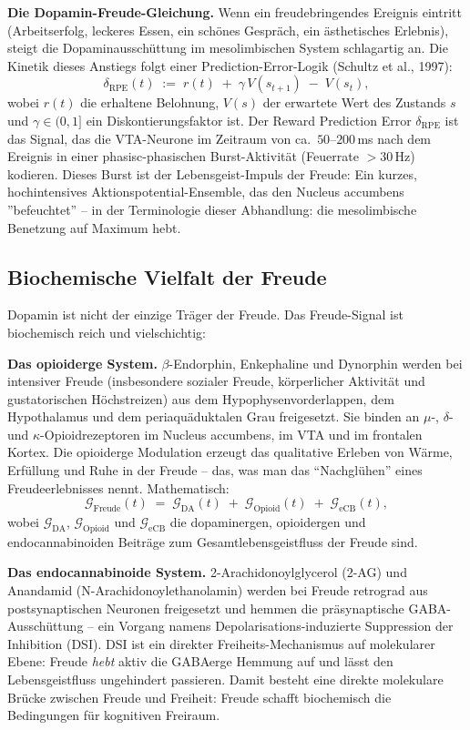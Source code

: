 ﻿\documentclass[12pt,a4paper]{report}
\theoremstyle{plain}
\theoremstyle{definition}
\theoremstyle{remark}
\begin{document}
	\textbf{Die Dopamin-Freude-Gleichung.}
	Wenn ein freudebringendes Ereignis eintritt (Arbeitserfolg,
	leckeres Essen, ein schönes Gespräch, ein ästhetisches Erlebnis),
	steigt die Dopaminausschüttung im mesolimbischen System
	schlagartig an. Die Kinetik dieses Anstiegs folgt einer
	Prediction-Error-Logik (Schultz et al., 1997):
	\[
	\delta_{\mathrm{RPE}}(t)
	\;:=\; r(t) \;+\; \gamma\,V(s_{t+1}) \;-\; V(s_t),
	\]
	wobei $r(t)$ die erhaltene Belohnung, $V(s)$ der erwartete Wert
	des Zustands $s$ und $\gamma \in (0,1]$ ein Diskontierungsfaktor ist.
	Der Reward Prediction Error $\delta_{\mathrm{RPE}}$ ist das Signal,
	das die VTA-Neurone im Zeitraum von ca.\ $50$--$200$\,ms nach
	dem Ereignis in einer phasisc-phasischen Burst-Aktivität
	(Feuerrate $> 30$\,Hz) kodieren.
	Dieses Burst ist der Lebensgeist-Impuls der Freude:
	Ein kurzes, hochintensives Aktionspotential-Ensemble, das den
	Nucleus accumbens ''befeuchtet'' -- in der Terminologie dieser
	Abhandlung: die mesolimbische Benetzung auf Maximum hebt.

	\subsection{Biochemische Vielfalt der Freude}

	Dopamin ist nicht der einzige Träger der Freude.
	Das Freude-Signal ist biochemisch reich und vielschichtig:

	\textbf{Das opioiderge System.}
	$\beta$-Endorphin, Enkephaline und Dynor\-phin werden bei intensiver
	Freude (insbesondere sozialer Freude, körperlicher Aktivität und
	gustatorischen Höchstreizen) aus dem Hypophysenvorderlappen,
	dem Hypothalamus und dem periaquäduktalen Grau freigesetzt.
	Sie binden an $\mu$-, $\delta$- und $\kappa$-Opioidrezeptoren
	im Nucleus accumbens, im VTA und im frontalen Kortex.
	Die opioiderge Modulation erzeugt das qualitative Erleben
	von Wärme, Erfüllung und Ruhe in der Freude --
	das, was man das ``Nachglühen'' eines Freudeerlebnisses nennt.
	Mathematisch:
	\[
	\mathcal{G}_{\mathrm{Freude}}(t)
	\;=\; \mathcal{G}_{\mathrm{DA}}(t)
	\;+\; \mathcal{G}_{\mathrm{Opioid}}(t)
	\;+\; \mathcal{G}_{\mathrm{eCB}}(t),
	\]
	wobei $\mathcal{G}_{\mathrm{DA}}$, $\mathcal{G}_{\mathrm{Opioid}}$
	und $\mathcal{G}_{\mathrm{eCB}}$ die dopaminergen, opioidergen
	und endocannabinoiden Beiträge zum Gesamtleben{s}geistfluss der
	Freude sind.

	\textbf{Das endocannabinoide System.}
	2-Arachidonoylglycerol (2-AG) und Anandamid (N-Arachidonoylethano\-lamin)
	werden bei Freude retrograd aus postsynaptischen Neuronen freigesetzt
	und hemmen die präsynaptische GABA-Ausschüttung --
	ein Vorgang namens Depolarisations-induzierte Suppression
	der Inhibition (DSI).
	DSI ist ein direkter Freiheits-Mechanismus auf molekularer Ebene:
	Freude \emph{hebt} aktiv die GABAerge Hemmung auf und lässt den
	Lebensgeistfluss ungehindert passieren.
	Damit besteht eine direkte molekulare Brücke zwischen Freude und Freiheit:
	Freude schafft biochemisch die Bedingungen für kognitiven Freiraum.
\end{document}
